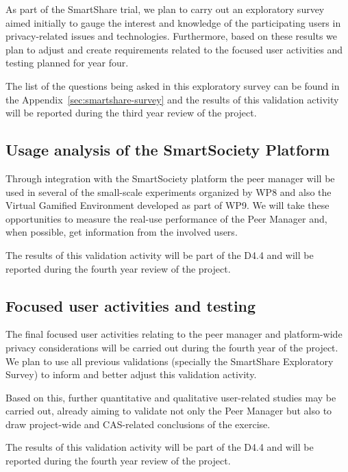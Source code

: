As part of the SmartShare trial, we plan to carry out an exploratory survey aimed initially to gauge the interest and knowledge of the participating users in privacy-related issues and technologies. Furthermore, based on these results we plan to adjust and create requirements related to the focused user activities and testing planned for year four.
 
The list of the questions being asked in this exploratory survey can be found in the Appendix~\ref{sec:smartshare-survey} and the results of this validation activity will be reported during the third year review of the project.

\subsection{Usage analysis of the SmartSociety Platform}
Through integration with the SmartSociety platform the peer manager will be used in several of the small-scale experiments organized by WP8 and also the Virtual Gamified Environment developed as part of WP9. We will take these opportunities to measure the real-use performance of the Peer Manager and, when possible, get information from the involved users.


The results of this validation activity will be part of the D4.4 and will be reported during the fourth year review of the project.

\subsection{Focused user activities and testing}
The final focused user activities relating to the peer manager and platform-wide privacy considerations will be carried out during the fourth year of the project. We plan to use all previous validations (specially the SmartShare Exploratory Survey) to inform and better adjust this validation activity. 

Based on this, further quantitative and qualitative user-related studies may be carried out, already aiming to validate not only the Peer Manager but also to draw project-wide and CAS-related conclusions of the exercise. 

The results of this validation activity will be part of the D4.4 and will be reported during the fourth year review of the project.
